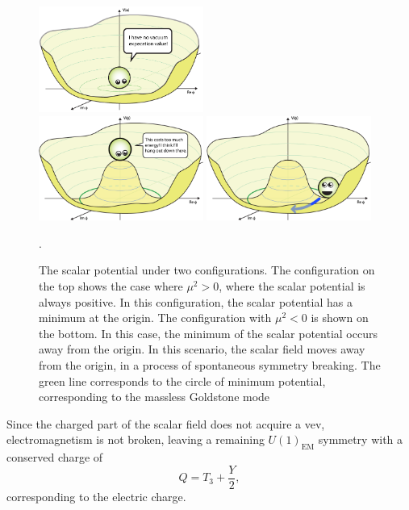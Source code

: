 \begin{figure}[ht]
  \centering
  \includegraphics[width=0.48\textwidth]
      {figs/theory/BoringPotential.png}
  \\
  \includegraphics[width=0.48\textwidth]
      {figs/theory/Higgs-Potential-lookdown.png}
  \includegraphics[width=0.48\textwidth]
      {figs/theory/Higgs-Potential-Goldstone.png}
      \caption{The scalar potential under two configurations.
        The configuration on the top shows the case where $\mu^2 > 0$, where
        the scalar potential is always positive.
        In this configuration, the scalar potential has a minimum at the origin.
        The configuration with $\mu^2 < 0$ is shown on the bottom.
        In this case, the minimum of the scalar potential occurs away from the
        origin.
        In this scenario, the scalar field moves away from the origin, in a
        process of spontaneous symmetry breaking.
        The green line corresponds to the circle of minimum potential,
        corresponding to the massless Goldstone
      mode~\cite{QuantumDiariesHiggs}}.
  \label{fig:symmetry_breaking}
\end{figure}

Since the charged part of the scalar field does not acquire a vev,
electromagnetism is not broken, leaving a remaining $U(1)_\mathrm{EM}$
symmetry with a conserved charge of
\begin{equation}
  Q = T_3 + \frac{Y}{2},
\end{equation}
corresponding to the electric charge.


